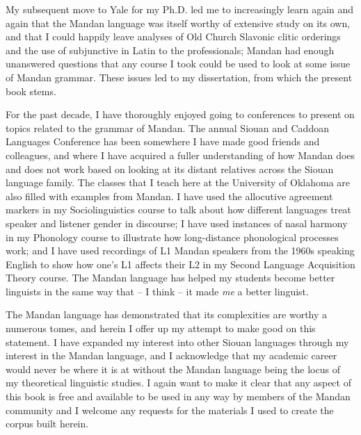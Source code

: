 My subsequent move to Yale for my Ph.D. led me to increasingly learn again and again that the Mandan language was itself worthy of extensive study on its own, and that I could happily leave analyses of Old Church Slavonic clitic orderings and the use of subjunctive in Latin to the professionals; Mandan had enough unanswered questions that any course I took could be used to look at some issue of Mandan grammar. These issues led to my dissertation, from which the present book stems. 

For the past decade, I have thoroughly enjoyed going to conferences to present on topics related to the grammar of Mandan. The annual Siouan and Caddoan Languages Conference has been somewhere I have made good friends and colleagues, and where I have acquired a fuller understanding of how Mandan does and does not work based on looking at its distant relatives across the Siouan language family. The classes that I teach here at the University of Oklahoma are also filled with examples from Mandan. I have used the allocutive agreement markers in my Sociolinguistics course to talk about how different languages treat speaker and listener gender in discourse; I have used instances of nasal harmony in my Phonology course to illustrate how long-distance phonological processes work; and I have used recordings of L1 Mandan speakers from the 1960s speaking English to show how one's L1 affects their L2 in my Second Language Acquisition Theory course. The Mandan language has helped my students become better linguists in the same way that -- I think -- it made \textit{me} a better linguist.

The Mandan language has demonstrated that its complexities are worthy a numerous tomes, and herein I offer up my attempt to make good on this statement. I have expanded my interest into other Siouan languages through my interest in the Mandan language, and I acknowledge that my academic career would never be where it is at without the Mandan language being the locus of my theoretical linguistic studies. I again want to make it clear that any aspect of this book is free and available to be used in any way by members of the Mandan community and I welcome any requests for the materials I used to create the corpus built herein.